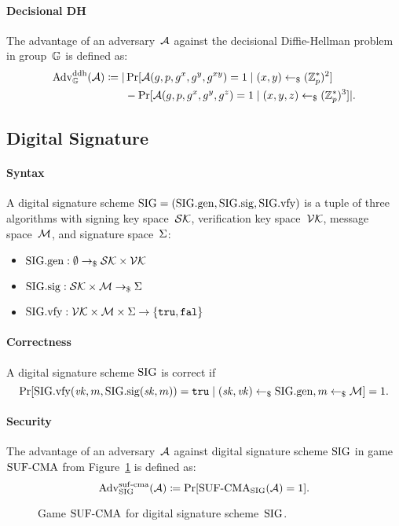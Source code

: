 \documentclass[a4paper,orivec]{llncs}
\begin{document}
\paragraph{Decisional DH}
The advantage of an adversary~$\mathcal{A}$ against the decisional Diffie-Hellman problem in group~$\mathbb{G}$ is defined as:
\begin{align*}
    \mathrm{Adv}_{\mathbb{G}}^{\mathrm{ddh}}(\mathcal{A})\coloneqq|&\Pr[\mathcal{A}(g,p,g^x,g^y,g^{xy})=1\mid (x,y)\gets_\$(\mathbb{Z}_p^*)^2]\\
    &-\Pr[\mathcal{A}(g,p,g^x,g^y,g^z)=1\mid (x,y,z)\gets_\$(\mathbb{Z}_p^*)^3]|\text{.}
\end{align*}

\subsection{Digital Signature}

\paragraph{Syntax}
A digital signature scheme $\mathrm{SIG}=(\mathrm{SIG}.\mathrm{gen},\mathrm{SIG}.\mathrm{sig},\mathrm{SIG}.\mathrm{vfy})$ is a tuple of three algorithms with signing key space~$\mathcal{SK}$, verification key space~$\mathcal{VK}$, message space~$\mathcal{M}$, and signature space~$\Sigma$:

\begin{itemize}
    \item $\mathrm{SIG}.\mathrm{gen}: \emptyset \to_\$ \mathcal{SK}\times\mathcal{VK}$
    \item $\mathrm{SIG}.\mathrm{sig}: \mathcal{SK}\times\mathcal{M} \to_\$ \Sigma$
    \item $\mathrm{SIG}.\mathrm{vfy}: \mathcal{VK}\times\mathcal{M}\times\Sigma \to \{\mathtt{tru},\mathtt{fal}\}$
\end{itemize}

\paragraph{Correctness}
A digital signature scheme $\mathrm{SIG}$ is correct if
\[
\Pr[\mathrm{SIG}.\mathrm{vfy}(\mathit{vk},m,\mathrm{SIG}.\mathrm{sig}(\mathit{sk},m))=\mathtt{tru}\mid (\mathit{sk},\mathit{vk})\gets_\$\mathrm{SIG}.\mathrm{gen},m\gets_\$\mathcal{M}]=1\text{.}
\]

\paragraph{Security}
The advantage of an adversary~$\mathcal{A}$ against digital signature scheme $\mathrm{SIG}$ in game ${\mathrm{SUF}\text{-}\mathrm{CMA}}$ from Figure~\ref{fig:sig:suf} is defined as:
\[
\mathrm{Adv}_{\mathrm{SIG}}^{\mathrm{suf}\text{-}\mathrm{cma}}(\mathcal{A})\coloneqq\Pr[{\mathrm{SUF}\text{-}\mathrm{CMA}}_{\mathrm{SIG}}(\mathcal{A})=1]\text{.}
\]

\begin{figure}[!ht]
    \centering
    \nicoresetlinenr%
    \fbox{%
        \scalebox{\codescalefactor}{%
        }%
    }
    \caption{%
        Game ${\mathrm{SUF}\text{-}\mathrm{CMA}}$ for digital signature scheme~$\mathrm{SIG}$.
    }
    \label{fig:sig:suf}
\end{figure}
\end{document}
